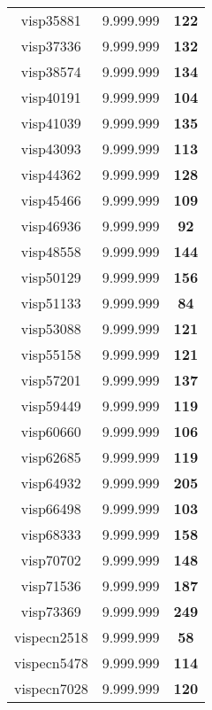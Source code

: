 \begin{tabular}{cc||c}
visp35881        & 9.999.999        & {\bf 122}       \\ 
visp37336        & 9.999.999        & {\bf 132}       \\ 
visp38574        & 9.999.999        & {\bf 134}       \\ 
visp40191        & 9.999.999        & {\bf 104}       \\ 
visp41039        & 9.999.999        & {\bf 135}       \\ 
visp43093        & 9.999.999        & {\bf 113}       \\ 
visp44362        & 9.999.999        & {\bf 128}       \\ 
visp45466        & 9.999.999        & {\bf 109}       \\ 
visp46936        & 9.999.999        & {\bf 92}        \\ 
visp48558        & 9.999.999        & {\bf 144}       \\ 
visp50129        & 9.999.999        & {\bf 156}       \\ 
visp51133        & 9.999.999        & {\bf 84}        \\ 
visp53088        & 9.999.999        & {\bf 121}       \\ 
visp55158        & 9.999.999        & {\bf 121}       \\ 
visp57201        & 9.999.999        & {\bf 137}       \\ 
visp59449        & 9.999.999        & {\bf 119}       \\ 
visp60660        & 9.999.999        & {\bf 106}       \\ 
visp62685        & 9.999.999        & {\bf 119}       \\ 
visp64932        & 9.999.999        & {\bf 205}       \\ 
visp66498        & 9.999.999        & {\bf 103}       \\ 
visp68333        & 9.999.999        & {\bf 158}       \\ 
visp70702        & 9.999.999        & {\bf 148}       \\ 
visp71536        & 9.999.999        & {\bf 187}       \\ 
visp73369        & 9.999.999        & {\bf 249}       \\ 
vispecn2518      & 9.999.999        & {\bf 58}        \\ 
vispecn5478      & 9.999.999        & {\bf 114}       \\ 
vispecn7028      & 9.999.999        & {\bf 120}       \\ 

\end{tabular}
